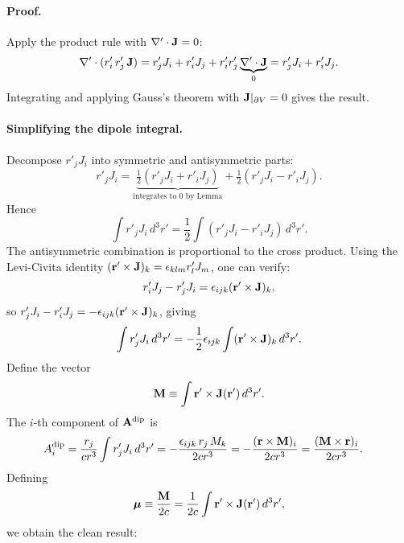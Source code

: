 
\paragraph{Proof.}
Apply the product rule with $\nabla'\cdot\mathbf{J} = 0$:
\begin{equation}
  \nabla'\cdot(r'_i\,r'_j\,\mathbf{J})
  = r'_j J_i + r'_i J_j + r'_i r'_j\underbrace{\nabla'\cdot\mathbf{J}}_{0}
  = r'_j J_i + r'_i J_j.
\end{equation}
Integrating and applying Gauss's theorem with $\mathbf{J}|_{\partial V}=0$ gives the result.

\paragraph{Simplifying the dipole integral.}
Decompose $r'_j J_i$ into symmetric and antisymmetric parts:
\begin{equation}\label{eq:lec15-decompose}
  r'_j J_i
  = \underbrace{\tfrac{1}{2}(r'_j J_i + r'_i J_j)}_{\text{integrates to }0\text{ by Lemma}}
  + \tfrac{1}{2}(r'_j J_i - r'_i J_j).
\end{equation}
Hence
\begin{equation}\label{eq:lec15-antisym}
  \int r'_j J_i\,d^3r' = \frac{1}{2}\int(r'_j J_i - r'_i J_j)\,d^3r'.
\end{equation}
The antisymmetric combination is proportional to the cross product.  Using the
Levi-Civita identity $(\mathbf{r}'\times\mathbf{J})_k = \epsilon_{klm}r'_l J_m$, one can
verify:
\begin{equation}\label{eq:lec15-cross-id}
  r'_i J_j - r'_j J_i = \epsilon_{ijk}(\mathbf{r}'\times\mathbf{J})_k,
\end{equation}
so $r'_j J_i - r'_i J_j = -\epsilon_{ijk}(\mathbf{r}'\times\mathbf{J})_k$, giving
\begin{equation}\label{eq:lec15-antisym-2}
  \int r'_j J_i\,d^3r' = -\frac{1}{2}\epsilon_{ijk}\int(\mathbf{r}'\times\mathbf{J})_k\,d^3r'.
\end{equation}
Define the vector
\begin{equation}\label{eq:lec15-M-def}
  \mathbf{M} \equiv \int\mathbf{r}'\times\mathbf{J}(\mathbf{r}')\,d^3r'.
\end{equation}
The $i$-th component of $\mathbf{A}^{\rm dip}$ is
\begin{align}
  A^{\rm dip}_i
  &= \frac{r_j}{cr^3}\int r'_j J_i\,d^3r'
   = -\frac{\epsilon_{ijk}\,r_j\,M_k}{2cr^3}
   = -\frac{(\mathbf{r}\times\mathbf{M})_i}{2cr^3}
   = \frac{(\mathbf{M}\times\mathbf{r})_i}{2cr^3}. \label{eq:lec15-Adip-index}
\end{align}
Defining
\begin{equation}\label{eq:lec15-bmu-def-math}
  \boldsymbol{\mu} \equiv \frac{\mathbf{M}}{2c} = \frac{1}{2c}\int\mathbf{r}'\times\mathbf{J}(\mathbf{r}')\,d^3r',
\end{equation}
we obtain the clean result:

